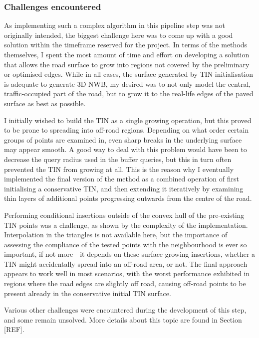 \subsubsection{Challenges encountered}

As implementing such a complex algorithm in this pipeline step was not originally intended, the biggest challenge here was to come up with a good solution within the timeframe reserved for the project. In terms of the methods themselves, I spent the most amount of time and effort on developing a solution that allows the road surface to grow into regions not covered by the preliminary or optimised edges. While in all cases, the surface generated by TIN initialisation is adequate to generate 3D-NWB, my desired was to not only model the central, traffic-occupied part of the road, but to grow it to the real-life edges of the paved surface as best as possible.

I initially wished to build the TIN as a single growing operation, but this proved to be prone to spreading into off-road regions. Depending on what order certain groups of points are examined in, even sharp breaks in the underlying surface may appear smooth. A good way to deal with this problem would have been to decrease the query radius used in the buffer queries, but this in turn often prevented the TIN from growing at all. This is the reason why I eventually implemented the final version of the method as a combined operation of first initialising a conservative TIN, and then extending it iteratively by examining thin layers of additional points progressing outwards from the centre of the road.

Performing conditional insertions outside of the convex hull of the pre-existing TIN points was a challenge, as shown by the complexity of the implementation. Interpolation in the triangles is not available here, but the importance of assessing the compliance of the tested points with the neighbourhood is ever so important, if not more - it depends on these surface growing insertions, whether a TIN might accidentally spread into an off-road area, or not. The final approach appears to work well in most scenarios, with the worst performance exhibited in regions where the road edges are slightly off road, causing off-road points to be present already in the conservative initial TIN surface.

Various other challenges were encountered during the development of this step, and some remain unsolved. More details about this topic are found in Section [REF].

